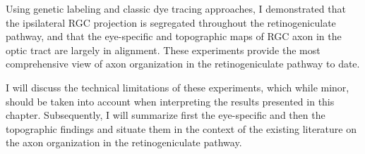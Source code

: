 Using genetic labeling and classic dye tracing approaches, I demonstrated that the ipsilateral RGC projection is segregated throughout the retinogeniculate pathway, and that the eye-specific and topographic maps of RGC axon in the optic tract are largely in alignment.
These experiments provide the most comprehensive view of axon organization in the retinogeniculate pathway to date.

I will discuss the technical limitations of these experiments, which while minor, should be taken into account when interpreting the results presented in this chapter.
Subsequently, I will summarize first the eye-specific and then the topographic findings and situate them in the context of the existing literature on the axon organization in the retinogeniculate pathway.
